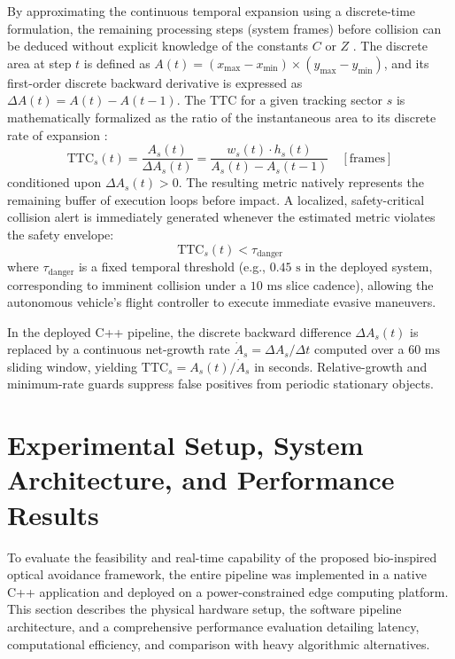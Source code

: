 \documentclass[conference]{IEEEtran}
\begin{document}
By approximating the continuous temporal expansion using a discrete-time formulation, the remaining processing steps (system frames) before collision can be deduced without explicit knowledge of the constants $C$ or $Z$ \cite{b13}. The discrete area at step $t$ is defined as $A(t) = (x_{\max} - x_{\min}) \times (y_{\max} - y_{\min})$, and its first-order discrete backward derivative is expressed as $\Delta A(t) = A(t) - A(t-1)$. The $\text{TTC}$ for a given tracking sector $s$ is mathematically formalized as the ratio of the instantaneous area to its discrete rate of expansion \cite{b13}:
\begin{equation}
    \text{TTC}_s(t) = \frac{A_s(t)}{\Delta A_s(t)} = \frac{w_s(t) \cdot h_s(t)}{A_s(t) - A_s(t-1)} \quad [\text{frames}]
\end{equation}
conditioned upon $\Delta A_s(t) > 0$. The resulting metric natively represents the remaining buffer of execution loops before impact. A localized, safety-critical collision alert is immediately generated whenever the estimated metric violates the safety envelope:
\begin{equation}
    \text{TTC}_s(t) < \tau_{\text{danger}}
\end{equation}
where $\tau_{\text{danger}}$ is a fixed temporal threshold (e.g., $0.45\text{ s}$ in the deployed system, corresponding to imminent collision under a $10\text{ ms}$ slice cadence), allowing the autonomous vehicle's flight controller to execute immediate evasive maneuvers.

In the deployed C++ pipeline, the discrete backward difference $\Delta A_s(t)$ is replaced by a continuous net-growth rate $\dot{A}_s = \Delta A_s / \Delta t$ computed over a $60\text{ ms}$ sliding window, yielding $\text{TTC}_s = A_s(t) / \dot{A}_s$ in seconds. Relative-growth and minimum-rate guards suppress false positives from periodic stationary objects.

\section{Experimental Setup, System Architecture, and Performance Results}

To evaluate the feasibility and real-time capability of the proposed bio-inspired optical avoidance framework, the entire pipeline was implemented in a native C++ application and deployed on a power-constrained edge computing platform. This section describes the physical hardware setup, the software pipeline architecture, and a comprehensive performance evaluation detailing latency, computational efficiency, and comparison with heavy algorithmic alternatives.
\end{document}
